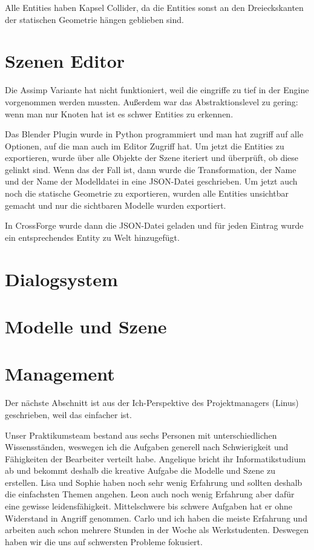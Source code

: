 Alle Entities haben Kapsel Collider, da die Entities sonst an den Dreieckskanten der statischen Geometrie hängen geblieben sind.

\section{Szenen Editor}

Die Assimp Variante hat nicht funktioniert, weil die eingriffe zu tief in der Engine vorgenommen werden mussten. Außerdem war das Abstraktionslevel zu gering: wenn man nur Knoten hat ist es schwer Entities zu erkennen.

Das Blender Plugin wurde in Python programmiert und man hat zugriff auf alle Optionen, auf die man auch im Editor Zugriff hat. Um jetzt die Entities zu exportieren, wurde über alle Objekte der Szene iteriert und überprüft, ob diese gelinkt sind. Wenn das der Fall ist, dann wurde die Transformation, der Name und der Name der Modelldatei in eine JSON-Datei geschrieben. Um jetzt auch noch die statische Geometrie zu exportieren, wurden alle Entities unsichtbar gemacht und nur die sichtbaren Modelle wurden exportiert.

In CrossForge wurde dann die JSON-Datei geladen und für jeden Eintrag wurde ein entsprechendes Entity zu Welt hinzugefügt.

\section{Dialogsystem}

\section{Modelle und Szene}

\section{Management}

Der nächste Abschnitt ist aus der Ich-Perspektive des Projektmanagers (Linus) geschrieben, weil das einfacher ist.

Unser Praktikumsteam bestand aus sechs Personen mit unterschiedlichen Wissensständen, weswegen ich die Aufgaben generell nach Schwierigkeit und Fähigkeiten der Bearbeiter verteilt habe. Angelique bricht ihr Informatikstudium ab und bekommt deshalb die kreative Aufgabe die Modelle und Szene zu erstellen. Lisa und Sophie haben noch sehr wenig Erfahrung und sollten deshalb die einfachsten Themen angehen. Leon auch noch wenig Erfahrung aber dafür eine gewisse leidensfähigkeit. Mittelschwere bis schwere Aufgaben hat er ohne Widerstand in Angriff genommen. Carlo und ich haben die meiste Erfahrung und arbeiten auch schon mehrere Stunden in der Woche als Werkstudenten. Deswegen haben wir die uns auf schwersten Probleme fokusiert.

